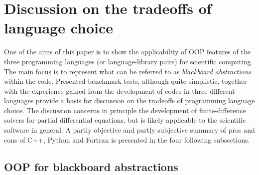 \documentclass[review,peprint,10pt,5p,times]{elsarticle}
\begin{document}
  \section{Discussion on the tradeoffs of language choice}

  One of the aims of this paper is to show the applicability of OOP features of the three
    programming languages (or language-library pairs) for scientific computing.
  The main focus is to represent
    what can be referred to as {\em blackboard abstractions} \citep{Rouson_et_al_2012} within the code.
  Presented benchmark tests, although quite simplistic, together with the experience gained 
    from the development of codes in three different
    languages provide a basis for discussion on the tradeoffs of programming language choice.
  The discussion concerns in principle the development of finite-difference solvers for 
    partial differential equations, but is likely applicable to the scientific software in general.
  A partly objective and partly subjective summary of pros and cons of C++, Python and Fortran
    is presented in the four following subsections.

  \subsection{OOP for blackboard abstractions}
\end{document}
